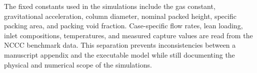             
            

            The fixed constants used in the simulations include the gas constant, gravitational acceleration, column diameter, nominal packed height, specific packing area, and packing void fraction. Case-specific flow rates, lean loading, inlet compositions, temperatures, and measured capture values are read from the NCCC benchmark data. This separation prevents inconsistencies between a manuscript appendix and the executable model while still documenting the physical and numerical scope of the simulations.
    \clearpage
